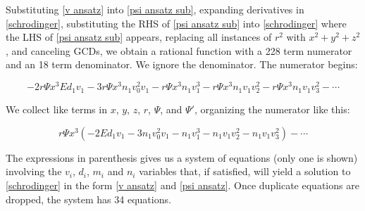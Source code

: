 \documentclass{article}
\begin{document}
Substituting \eqref{v ansatz} into \eqref{psi ansatz sub}, expanding derivatives in \eqref{schrodinger},
substituting the RHS of \eqref{psi ansatz sub} into \eqref{schrodinger} where the LHS of
\eqref{psi ansatz sub} appears,
replacing all instances of $r^2$ with $x^2+y^2+z^2$, and canceling GCDs, we obtain a rational function
with a 228 term numerator and an 18 term denominator.  We ignore the denominator.  The numerator begins:

\begin{equation}
-2r\Psi x^3 E d_1 v_1 - 3r\Psi x^3 n_1 v_0^2 v_1 - r\Psi x^3 n_1 v_1^3 - r\Psi x^3 n_1 v_1 v_2^2 - r\Psi x^3 n_1 v_1 v_3^2 - \cdots
\end{equation}

We collect like terms in $x$, $y$, $z$, $r$, $\Psi$, and $\Psi'$, organizing the numerator like this:

\begin{equation}
r\Psi x^3 \left(-2 E d_1 v_1 - 3 n_1 v_0^2 v_1 - n_1 v_1^3 - n_1 v_1 v_2^2 - n_1 v_1 v_3^2\right) - \cdots
\end{equation}

The expressions in parenthesis gives us a system of equations (only one is shown)
involving the $v_i$, $d_i$, $m_i$ and $n_i$ variables that, if satisfied,
will yield a solution to \eqref{schrodinger} in the form \eqref{v ansatz} and \eqref{psi ansatz}.  Once
duplicate equations are dropped, the system has 34 equations.
\end{document}
